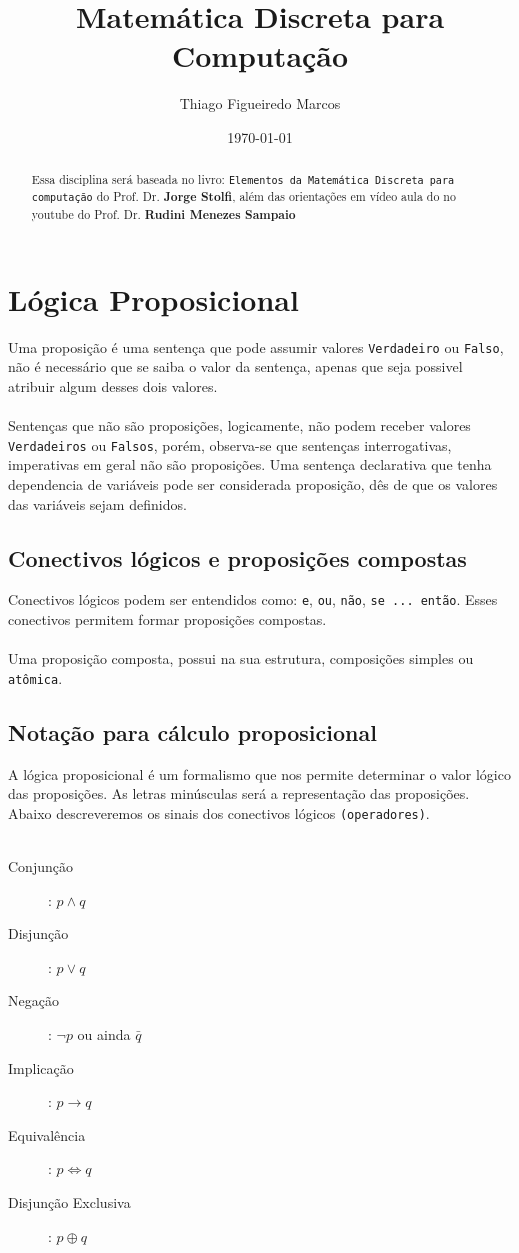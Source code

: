 \documentclass[12pt, onecolumn]{article}
\title{Matemática Discreta para Computação}
\author{Thiago Figueiredo Marcos}
\date{\today}
\begin{document}
	\maketitle
	
	\begin{abstract}
	Essa disciplina será baseada no livro: \texttt{Elementos da Matemática Discreta
		para computação} do Prof. Dr. \textbf{Jorge Stolfi},
		além das orientações em vídeo aula do no youtube do Prof. Dr. 
		\textbf{Rudini Menezes Sampaio}
	\end{abstract}

	\section{Lógica Proposicional}
	Uma proposição é uma sentença que pode assumir valores \texttt{Verdadeiro} 
	ou \texttt{Falso}, não é necessário que se saiba o valor da sentença, apenas
	que seja possivel atribuir algum desses dois valores.\\
	\\
	Sentenças que não são proposições, logicamente, não podem receber valores
	\texttt{Verdadeiros} ou \texttt{Falsos}, porém, observa-se que sentenças
	interrogativas, imperativas em geral não são proposições. Uma sentença 
	declarativa que tenha dependencia de variáveis pode ser considerada
	proposição, dês de que os valores das variáveis sejam definidos.
	
		\subsection{Conectivos lógicos e proposições compostas}
		Conectivos lógicos podem ser entendidos como: \texttt{e}, 
		\texttt{ou}, \texttt{não}, \texttt{se ... então}. Esses 
		conectivos permitem formar proposições compostas.\\
		\\
		Uma proposição composta, possui na sua estrutura, composições
		simples ou \texttt{atômica}.

		\subsection{Notação para cálculo proposicional}
		A lógica proposicional é um formalismo que nos permite
		determinar o valor lógico das proposições. As letras minúsculas
		será a representação das proposições. Abaixo descreveremos
		os sinais dos conectivos lógicos \texttt{(operadores)}.\\
		\\
		\begin{description}
			\item[Conjunção]: $p \land q$
			\item[Disjunção]: $p \lor q$
			\item[Negação]: $\lnot p$ ou ainda $\bar{q}$
			\item[Implicação]: $p \longrightarrow q$
			\item[Equivalência]: $p \Longleftrightarrow q$
			\item[Disjunção Exclusiva]: $p \oplus q$
		\end{description}
\end{document}
